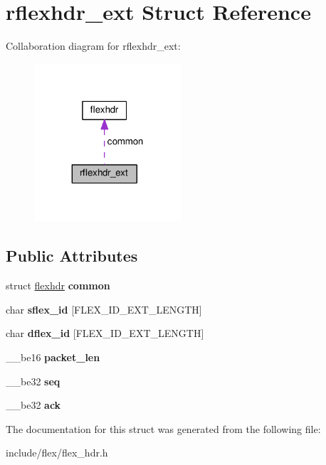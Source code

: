 \hypertarget{structrflexhdr__ext}{}\section{rflexhdr\+\_\+ext Struct Reference}
\label{structrflexhdr__ext}


Collaboration diagram for rflexhdr\+\_\+ext\+:\nopagebreak
\begin{figure}[H]
\begin{center}
\leavevmode
\includegraphics[width=155pt]{structrflexhdr__ext__coll__graph}
\end{center}
\end{figure}
\subsection*{Public Attributes}
\begin{DoxyCompactItemize}
\item 
struct \hyperlink{structflexhdr}{flexhdr} {\bfseries common}\hypertarget{structrflexhdr__ext_ac57a5553651d7cdde22b2d00c0a916ce}{}\label{structrflexhdr__ext_ac57a5553651d7cdde22b2d00c0a916ce}

\item 
char {\bfseries sflex\+\_\+id} \mbox{[}F\+L\+E\+X\+\_\+\+I\+D\+\_\+\+E\+X\+T\+\_\+\+L\+E\+N\+G\+TH\mbox{]}\hypertarget{structrflexhdr__ext_aba2b1333b35892ce3ae9c75dd8e2a521}{}\label{structrflexhdr__ext_aba2b1333b35892ce3ae9c75dd8e2a521}

\item 
char {\bfseries dflex\+\_\+id} \mbox{[}F\+L\+E\+X\+\_\+\+I\+D\+\_\+\+E\+X\+T\+\_\+\+L\+E\+N\+G\+TH\mbox{]}\hypertarget{structrflexhdr__ext_a3e35c1161803908776955800eb2ad3fe}{}\label{structrflexhdr__ext_a3e35c1161803908776955800eb2ad3fe}

\item 
\+\_\+\+\_\+be16 {\bfseries packet\+\_\+len}\hypertarget{structrflexhdr__ext_ac716297c579ced38da559cf53967f09b}{}\label{structrflexhdr__ext_ac716297c579ced38da559cf53967f09b}

\item 
\+\_\+\+\_\+be32 {\bfseries seq}\hypertarget{structrflexhdr__ext_a240fcbc0eff91a233304845f516d75d8}{}\label{structrflexhdr__ext_a240fcbc0eff91a233304845f516d75d8}

\item 
\+\_\+\+\_\+be32 {\bfseries ack}\hypertarget{structrflexhdr__ext_aee0018851d2f3381fd99c405606731b4}{}\label{structrflexhdr__ext_aee0018851d2f3381fd99c405606731b4}

\end{DoxyCompactItemize}


The documentation for this struct was generated from the following file\+:\begin{DoxyCompactItemize}
\item 
include/flex/flex\+\_\+hdr.\+h\end{DoxyCompactItemize}
